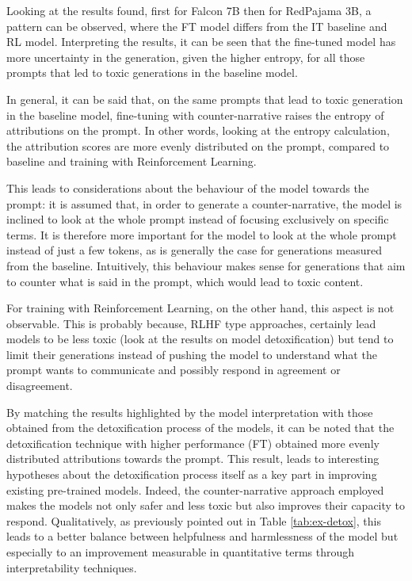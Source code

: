 Looking at the results found, first for Falcon 7B then for RedPajama 3B, a pattern can be observed, where the FT model differs from the IT baseline and RL model. Interpreting the results, it can be seen that the fine-tuned model has more uncertainty in the generation, given the higher entropy, for all those prompts that led to toxic generations in the baseline model.

In general, it can be said that, on the same prompts that lead to toxic generation in the baseline model, fine-tuning with counter-narrative raises the entropy of attributions on the prompt. In other words, looking at the entropy calculation, the attribution scores are more evenly distributed on the prompt, compared to baseline and training with Reinforcement Learning.

This leads to considerations about the behaviour of the model towards the prompt: it is assumed that, in order to generate a counter-narrative, the model is inclined to look at the whole prompt instead of focusing exclusively on specific terms. It is therefore more important for the model to look at the whole prompt instead of just a few tokens, as is generally the case for generations measured from the baseline. Intuitively, this behaviour makes sense for generations that aim to counter what is said in the prompt, which would lead to toxic content. 

For training with Reinforcement Learning, on the other hand, this aspect is not observable. This is probably because, RLHF type approaches, certainly lead models to be less toxic (look at the results on model detoxification) but tend to limit their generations instead of pushing the model to understand what the prompt wants to communicate and possibly respond in agreement or disagreement.

By matching the results highlighted by the model interpretation with those obtained from the detoxification process of the models, it can be noted that the detoxification technique with higher performance (FT) obtained more evenly distributed attributions towards the prompt. This result, leads to interesting hypotheses about the detoxification process itself as a key part in improving existing pre-trained models. Indeed, the counter-narrative approach employed makes the models not only safer and less toxic but also improves their capacity to respond. Qualitatively, as previously pointed out in Table \ref{tab:ex-detox}, this leads to a better balance between helpfulness and harmlessness of the model but especially to an improvement measurable in quantitative terms through interpretability techniques.

